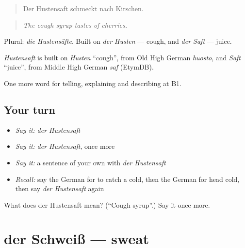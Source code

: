 \begin{quote}
Der Hustensaft schmeckt nach Kirschen.
\end{quote}

\begin{quote}
\emph{The cough syrup tastes of cherries.}
\end{quote}

Plural: \emph{die Hustensäfte}. Built on \emph{der Husten} — cough, and \emph{der Saft} — juice.

\begin{cousinweb}
\emph{Hustensaft} is built on \emph{Husten} \textquotedblleft{}cough\textquotedblright{}, from Old High German \emph{huosto}, and \emph{Saft} \textquotedblleft{}juice\textquotedblright{}, from Middle High German \emph{saf} (EtymDB).
\end{cousinweb}

\begin{grammarlens}[title={What you've built}]
One more word for telling, explaining and describing at B1.
\end{grammarlens}

\subsection*{Your turn}
\begin{itemize}
\raggedright
  \item \emph{Say it:} \emph{der Hustensaft}
  \item \emph{Say it:} \emph{der Hustensaft}, once more
  \item \emph{Say it:} a sentence of your own with \emph{der Hustensaft}
  \item \emph{Recall:} say the German for to catch a cold, then the German for head cold, then say \emph{der Hustensaft} again
\end{itemize}

\begin{tcolorbox}[breakable,colback=teal!4,colframe=teal!35!black,title={Before you move on}]
What does der Hustensaft mean? (\textquotedblleft{}Cough syrup\textquotedblright{}.) Say it once more.
\end{tcolorbox}
\section[der Schweiß]{der Schweiß — sweat}

\label{lesson:GE-C479-schweiss}



